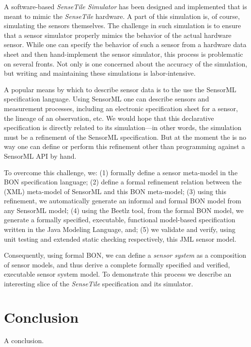 \documentclass{article}
\newcommand{\ST}{\emph{SenseTile}\xspace}
\newcommand{\STS}{\emph{SenseTile Simulator}\xspace}
\begin{document}
A software-based \STS has been designed and implemented that is meant
to mimic the \ST hardware.  A part of this simulation is, of course,
simulating the sensors themselves.  The challenge in such simulation
is to ensure that a sensor simulator properly mimics the behavior of
the actual hardware sensor.  While one can specify the behavior of
such a sensor from a hardware data sheet and then hand-implement the
sensor simulator, this process is problematic on several fronts.  Not
only is one concerned about the accuracy of the simulation, but
writing and maintaining these simulations is labor-intensive.

A popular means by which to describe sensor data is to the use the
SensorML specification language.  Using SensorML one can describe
sensors and measurement processes, including an electronic
specification sheet for a sensor, the lineage of an observation, etc.
We would hope that this declarative specification is directly related
to its simulation---in other words, the simulation must be a
refinement of the SensorML specification.  But at the moment the is no
way one can define or perform this refinement other than programming
against a SensorML API by hand.

To overcome this challenge, we: (1) formally define a sensor
meta-model in the BON specification language; (2) define a formal
refinement relation between the (XML) meta-model of SensorML and this
BON meta-model; (3) using this refinement, we automatically generate
an informal and formal BON model from any SensorML model; (4) using
the Beetlz tool, from the formal BON model, we generate a formally
specified, executable, functional model-based specification written in
the Java Modeling Language, and; (5) we validate and verify, using
unit testing and extended static checking respectively, this JML
sensor model.

Consequently, using formal BON, we can define a \emph{sensor system}
as a composition of sensor models, and thus derive a complete formally
specified and verified, executable sensor system model.  To
demonstrate this process we describe an interesting slice of the \ST
specification and its simulator.

\section{Conclusion}

A conclusion.
\end{document}
